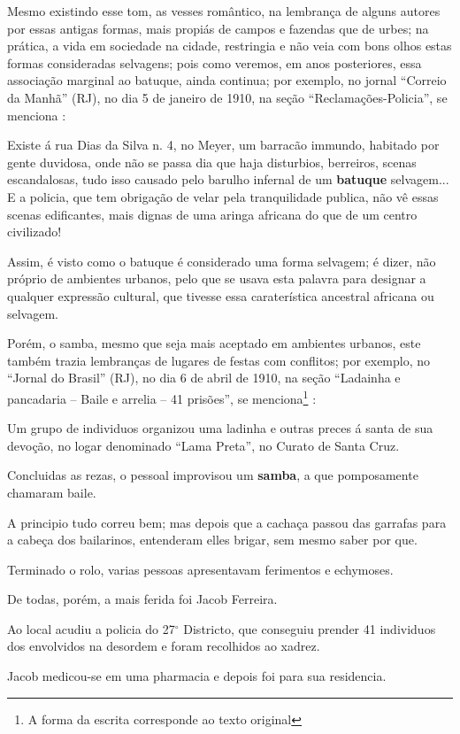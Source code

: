 Mesmo existindo esse tom, as vesses romântico, 
na lembrança de alguns autores por essas antigas formas,
mais propiás de campos e fazendas que de urbes;
na prática, a vida em sociedade na cidade, 
restringia e não veia com bons olhos estas formas consideradas selvagens;
pois como veremos, em anos posteriores, essa associação marginal ao batuque, ainda continua;
por exemplo, no jornal ``Correio da Manhã'' (RJ), 
no dia 5 de janeiro de 1910, na seção ``Reclamações-Policia'',
se menciona \cite[pp. 4]{batuqueperiodicocorreiomanha}:
\begin{citando}%
Existe á rua Dias da Silva n. 4, no 
Meyer, um barracão immundo, habitado por
gente duvidosa, onde não se passa dia que 
haja disturbios, berreiros, scenas 
escandalosas, tudo isso causado pelo barulho
infernal de um \textbf{batuque} selvagem... E a 
policia, que tem obrigação de velar pela 
tranquilidade publica, não vê essas scenas
edificantes, mais dignas de uma aringa 
africana do que de um centro civilizado!
\end{citando}
Assim, é visto como o batuque é considerado uma forma selvagem;
é dizer, não próprio de ambientes urbanos,
pelo que se usava esta palavra para designar a qualquer expressão cultural,
 que tivesse essa caraterística ancestral africana ou selvagem. 

Porém, o samba, mesmo que seja mais aceptado em ambientes urbanos,
este também trazia lembranças de lugares de festas com conflitos;
por exemplo, no ``Jornal do Brasil'' (RJ), 
no dia 6 de abril de 1910, na seção ``Ladainha e pancadaria -- Baile e arrelia -- 41 prisões'',
se menciona\footnote{\label{footort5}A forma da escrita corresponde ao texto original} \cite[pp. 12]{batuqueperiodicojornaldobrasil}:
\begin{citando}%
Um grupo de individuos organizou
uma ladinha e outras preces 
á santa de sua devoção, no logar 
denominado ``Lama Preta'', no 
Curato de Santa Cruz.

Concluidas as rezas, o pessoal 
improvisou um \textbf{samba}, a que 
pomposamente chamaram baile.

A principio tudo correu bem;
mas depois que a cachaça passou
das garrafas para a cabeça dos 
bailarinos, entenderam elles 
brigar, sem mesmo saber por que.

Terminado o rolo, varias 
pessoas apresentavam ferimentos e echymoses.

De todas, porém, a mais ferida foi Jacob Ferreira.

Ao local acudiu a policia do 27$^{\circ}$ 
Districto, que conseguiu prender 
41 individuos dos envolvidos na 
desordem e foram recolhidos ao xadrez.

Jacob medicou-se em uma pharmacia e depois foi para sua residencia.
\end{citando}



